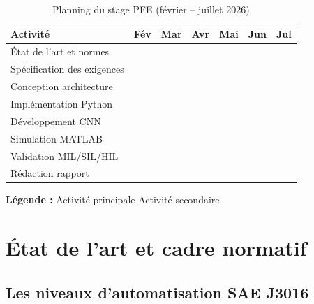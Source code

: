 \documentclass[12pt,a4paper]{report}
\begin{document}
\begin{table}[H]
\centering
\caption{Planning du stage PFE (f\'evrier -- juillet 2026)}
\label{tab:planning}
\begin{tabular}{L{4.5cm} C{1.2cm} C{1.2cm} C{1.2cm} C{1.2cm} C{1.2cm} C{1.2cm}}
\toprule
\textbf{Activit\'e} & \textbf{F\'ev} & \textbf{Mar} & \textbf{Avr} & \textbf{Mai} & \textbf{Jun} & \textbf{Jul} \\
\midrule
\'Etat de l'art et normes              &  &  & & & & \\
Sp\'ecification des exigences          & &  &  & & & \\
Conception architecture                & & &  &  & & \\
Impl\'ementation Python                & & &  &  & & \\
D\'eveloppement CNN                    & & & &  &  & \\
Simulation MATLAB                      & & & & &  &  \\
Validation MIL/SIL/HIL                 & & & & &  &  \\
R\'edaction rapport                    & & & &  &  &  \\
\bottomrule
\end{tabular}
\end{table}

\noindent\footnotesize{\textbf{L\'egende :} \colorbox{blue!30}{\phantom{XX}} Activit\'e principale \quad \colorbox{blue!10}{\phantom{XX}} Activit\'e secondaire}

\clearpage

\chapter{\'Etat de l'art et cadre normatif}

\section{Les niveaux d'automatisation SAE J3016}
\end{document}
